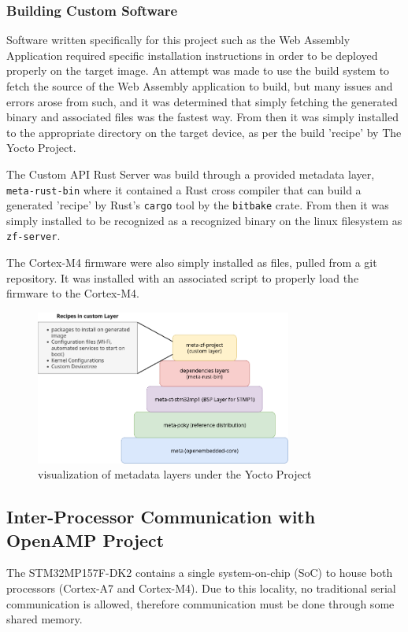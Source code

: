 \documentclass[12pt]{article}
\begin{document}
\subsubsection{Building Custom Software}
Software written specifically for this project such as the Web Assembly Application required specific installation
instructions in order to be deployed properly on the target image. An attempt was made to use the build system to
fetch the source of the Web Assembly application to build, but many issues and errors arose from such, and it was
determined that simply fetching the generated binary and associated files was the fastest way. From then it was simply installed
to the appropriate directory on the target device, as per the build 'recipe' by The Yocto Project.

The Custom API Rust Server was build through a provided metadata layer, \verb+meta-rust-bin+ where it contained
a Rust cross compiler that can build a generated 'recipe' by Rust's \verb+cargo+ tool by the \verb+bitbake+ crate. From
then it was simply installed to be recognized as a recognized binary on the linux filesystem as \verb+zf-server+.

The Cortex-M4 firmware were also simply installed as files, pulled from a git repository. It was installed with
an associated script to properly load the firmware to the Cortex-M4.

\begin{figure}[H]
  \includegraphics[width=0.75\textwidth]{../assets/layers.png}
  \caption{visualization of metadata layers under the Yocto Project}
\end{figure}


\subsection{Inter-Processor Communication with OpenAMP Project}
The STM32MP157F-DK2 contains a single system-on-chip (SoC) to house both processors (Cortex-A7 and Cortex-M4). 
Due to this locality, no traditional serial communication is allowed, therefore communication must be done through
some shared memory. 
\end{document}
